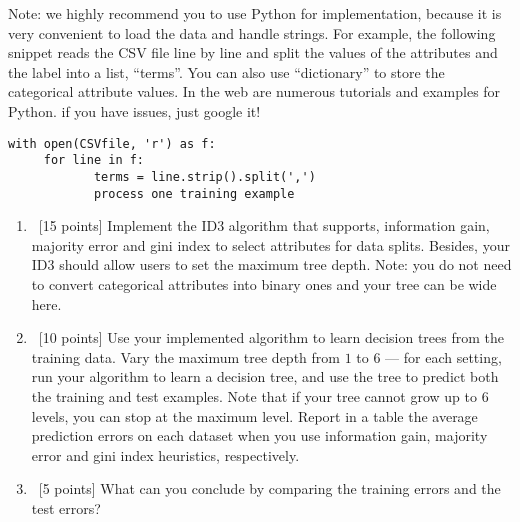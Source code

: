 \documentclass[12pt, fullpage,letterpaper]{article}
\begin{document}
\begin{enumerate}
\noindent Note: we highly recommend you to use Python for implementation, because it is very convenient to load the data and handle strings. For example, the following snippet reads the CSV file line by line and split the values of the attributes and the label into a list, ``terms''. You can also use ``dictionary'' to store the categorical attribute values. In the web are numerous tutorials and examples for Python. if you have issues, just google it!
\begin{lstlisting}
with open(CSVfile, 'r') as f:
     for line in f:
            terms = line.strip().split(',')
            process one training example
\end{lstlisting}
\begin{enumerate}
\item~[15 points] Implement the ID3 algorithm that supports, information gain,  majority error and gini index to select attributes for data splits. Besides, your ID3 should allow users to set the maximum tree depth. Note: you do not need to convert categorical attributes into binary ones and your tree can be wide here. 
\item~[10 points] Use your implemented algorithm to learn decision trees from the training data. Vary the maximum  tree depth from $1$ to $6$  --- for each setting, run your algorithm to learn a decision tree, and use the tree to  predict both the training  and test examples. Note that if your tree cannot grow up to 6 levels, you can stop at the maximum level. Report in a table the average prediction errors on each dataset when you use information gain, majority error and gini index heuristics, respectively.

\item~[5 points] What can you conclude by comparing the training errors and the test errors? 
\end{enumerate}



\end{enumerate}
\end{document}
